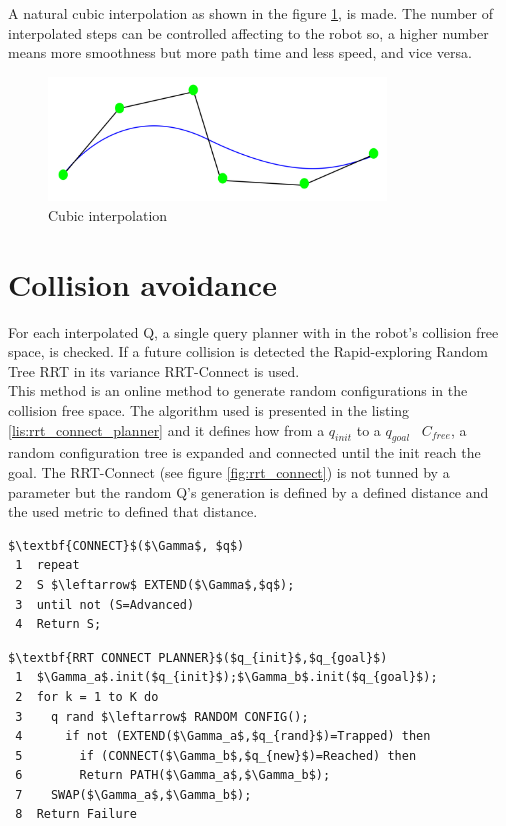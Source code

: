 A natural cubic interpolation as shown in the figure \ref{fig:cubic interpolation}, is made. The number of interpolated steps can be controlled affecting to the robot so, a higher number means more smoothness but more path time and less speed, and vice versa.

\begin{figure}[!hb]
	\centering
	\includegraphics[width=0.8\textwidth]{figures/cubic_interpolation}
	\caption{Cubic interpolation}
	\label{fig:cubic interpolation}
\end{figure}

\section{Collision avoidance} %
\label{sec:collision_avoidance}
For each interpolated Q, a single query planner with in the robot's collision free space, is checked. If a future collision is detected the Rapid-exploring Random Tree RRT in its variance RRT-Connect \cite{RRTConnect} is used.\\

This method is an online method to generate random configurations in the collision free space.
The algorithm used is presented in the listing \ref{lis:rrt_connect_planner} and it defines how from a $q_{init}$ to a $q_{goal}$ \in \ $C_{free}$, a random configuration tree is expanded and connected  until the init reach the goal. The RRT-Connect (see figure \ref{fig:rrt_connect}) is not tunned by a parameter but the random Q's generation is defined by a defined distance and the used metric to defined that distance.

\begin{lstlisting}[frame=tb, mathescape=true, xleftmargin=.28\textwidth, xrightmargin=.28\textwidth,caption=RRT-Connect Algorithm, label=lis:rrt_connect_planner]
$\textbf{CONNECT}$($\Gamma$, $q$)
 1  repeat 
 2  S $\leftarrow$ EXTEND($\Gamma$,$q$);
 3  until not (S=Advanced)
 4  Return S;
\end{lstlisting}
\lstset{}

\begin{lstlisting}[frame=tb, mathescape=true,xleftmargin=.13\textwidth, xrightmargin=.13\textwidth]
$\textbf{RRT CONNECT PLANNER}$($q_{init}$,$q_{goal}$)
 1  $\Gamma_a$.init($q_{init}$);$\Gamma_b$.init($q_{goal}$);
 2  for k = 1 to K do
 3    q rand $\leftarrow$ RANDOM CONFIG();
 4      if not (EXTEND($\Gamma_a$,$q_{rand}$)=Trapped) then
 5        if (CONNECT($\Gamma_b$,$q_{new}$)=Reached) then
 6        Return PATH($\Gamma_a$,$\Gamma_b$);
 7    SWAP($\Gamma_a$,$\Gamma_b$);
 8  Return Failure
\end{lstlisting}

